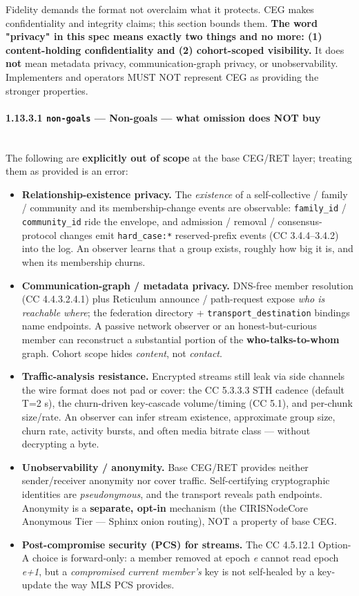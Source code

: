 \documentclass[11pt]{article}
\begin{document}
Fidelity demands the format not overclaim what it protects. CEG makes confidentiality and integrity claims; this section bounds them. \textbf{The word "privacy" in this spec means exactly two things and no more: (1) content-holding confidentiality and (2) cohort-scoped visibility.} It does \textbf{not} mean metadata privacy, communication-graph privacy, or unobservability. Implementers and operators MUST NOT represent CEG as providing the stronger properties.


\paragraph{1.13.3.1 \texttt{non-goals} — Non-goals — what omission does NOT buy}\mbox{}\\


The following are \textbf{explicitly out of scope} at the base CEG/RET layer; treating them as provided is an error:


\begin{itemize}\setlength\itemsep{0pt}
\item \textbf{Relationship-existence privacy.} The \textit{existence} of a self-collective / family / community and its membership-change events are observable: \texttt{family\_id} / \texttt{community\_id} ride the envelope, and admission / removal / consensus-protocol changes emit \texttt{hard\_case:*} reserved-prefix events (CC 3.4.4–3.4.2) into the log. An observer learns that a group exists, roughly how big it is, and when its membership churns.
\item \textbf{Communication-graph / metadata privacy.} DNS-free member resolution (CC 4.4.3.2.4.1) plus Reticulum announce / path-request expose \textit{who is reachable where}; the federation directory + \texttt{transport\_destination} bindings name endpoints. A passive network observer or an honest-but-curious member can reconstruct a substantial portion of the \textbf{who-talks-to-whom} graph. Cohort scope hides \textit{content}, not \textit{contact}.
\item \textbf{Traffic-analysis resistance.} Encrypted streams still leak via side channels the wire format does not pad or cover: the CC 5.3.3.3 STH cadence (default T=2 s), the churn-driven key-cascade volume/timing (CC 5.1), and per-chunk size/rate. An observer can infer stream existence, approximate group size, churn rate, activity bursts, and often media bitrate class — without decrypting a byte.
\item \textbf{Unobservability / anonymity.} Base CEG/RET provides neither sender/receiver anonymity nor cover traffic. Self-certifying cryptographic identities are \textit{pseudonymous}, and the transport reveals path endpoints. Anonymity is a \textbf{separate, opt-in} mechanism (the CIRISNodeCore Anonymous Tier — Sphinx onion routing), NOT a property of base CEG.
\item \textbf{Post-compromise security (PCS) for streams.} The CC 4.5.12.1 Option-A choice is forward-only: a member removed at epoch \textit{e} cannot read epoch \textit{e+1}, but a \textit{compromised current member's} key is not self-healed by a key-update the way MLS PCS provides.
\end{itemize}
\end{document}
